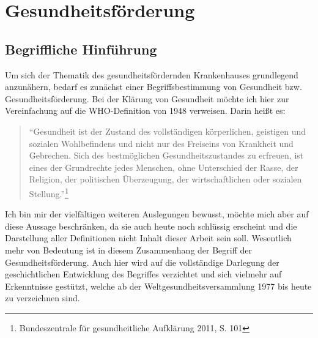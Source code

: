 \section{Gesundheitsförderung}
\label{sec:Gesundheitsförderung}

\subsection{Begriffliche Hinführung}
\label{sec:BegrifflicheHinführung}

Um sich der Thematik des gesundheitsfördernden Krankenhauses grundlegend anzunähern, bedarf es zunächst einer Begriffsbestimmung von Gesundheit bzw. Gesundheitsförderung. Bei der Klärung von Gesundheit möchte ich hier zur Vereinfachung auf die WHO-Definition von 1948 verweisen. Darin heißt es: 

\begin{quotation}
"`Gesundheit ist der Zustand des vollständigen körperlichen, geistigen und sozialen Wohlbefindens und nicht nur des Freiseins von Krankheit und Gebrechen. Sich des bestmöglichen Gesundheitszustandes zu erfreuen, ist eines der Grundrechte jedes Menschen, ohne Unterschied der  Rasse, der Religion, der politischen Überzeugung, der wirtschaftlichen oder sozialen Stellung."'\footnote{Bundeszentrale für gesundheitliche Aufklärung 2011, S. 101}
\end{quotation}

Ich bin mir der vielfältigen weiteren Auslegungen bewusst, möchte mich aber auf diese Aussage beschränken, da sie auch heute noch schlüssig erscheint und die Darstellung aller Definitionen nicht Inhalt dieser Arbeit sein soll. Wesentlich mehr von Bedeutung ist in diesem Zusammenhang der Begriff der Gesundheitsförderung. Auch hier wird auf die vollständige Darlegung der geschichtlichen Entwicklung des Begriffes verzichtet und sich vielmehr auf Erkenntnisse gestützt, welche ab der Weltgesundheitsversammlung 1977 bis heute zu verzeichnen sind.

